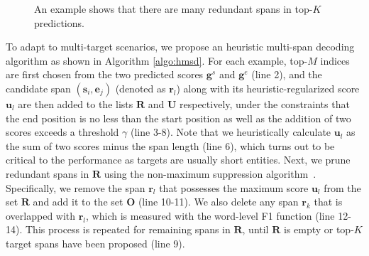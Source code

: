 \documentclass[11pt,a4paper]{article}
\begin{document}
\begin{figure}[h]
\center
{}
\caption{An example shows that there are many redundant spans in top-$K$ predictions.}
\label{fig:redun}
\end{figure}

To adapt to multi-target scenarios, we propose an heuristic multi-span decoding algorithm as shown in Algorithm \ref{algo:hmsd}.
For each example, top-$M$ indices are first chosen from the two predicted scores $\mathbf{g}^s$ and $\mathbf{g}^e$ (line 2), and the candidate span $(\mathbf{s}_i, \mathbf{e}_j)$ (denoted as $\mathbf{r}_l$) along with its heuristic-regularized score $\mathbf{u}_l$ are then added to the lists $\mathbf{R}$ and $\mathbf{U}$ respectively, under the constraints that the end position is no less than the start position as well as the addition of two scores exceeds a threshold $\gamma$ (line 3-8).
Note that we heuristically calculate $\mathbf{u}_l$ as the sum of two scores minus the span length (line 6), which turns out to be critical to the performance as targets are usually short entities.
Next, we prune redundant spans in $\mathbf{R}$ using the non-maximum suppression algorithm~\cite{rosenfeld1971edge}.
Specifically, we remove the span $\mathbf{r}_l$ that possesses the maximum score $\mathbf{u}_l$ from the set $\mathbf{R}$ and add it to the set $\mathbf{O}$ (line 10-11).
We also delete any span $\mathbf{r}_k$ that is overlapped with $\mathbf{r}_l$, which is measured with the word-level F1 function (line 12-14).
This process is repeated for remaining spans in $\mathbf{R}$, until $\mathbf{R}$ is empty or top-$K$ target spans have been proposed (line 9).
\end{document}
